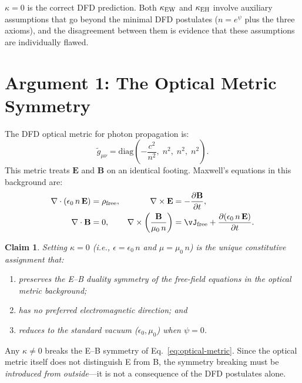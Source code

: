 \documentclass[12pt,a4paper]{article}
\newtheorem{claim}{Claim}
\theoremstyle{definition}
\theoremstyle{remark}
\newcommand{\vE}{\mathbf{E}}
\newcommand{\vB}{\mathbf{B}}
\begin{document}
\begin{tcolorbox}[colback=red!5!white, colframe=red!60!black, title=Central Claim of This Document]
$\kappa = 0$ is the correct DFD prediction.  Both $\kappa_{\rm EW}$
and $\kappa_{\rm EH}$ involve auxiliary assumptions that go beyond the
minimal DFD postulates ($n = e^\psi$ plus the three axioms), and the
disagreement between them is evidence that these assumptions are
individually flawed.
\end{tcolorbox}

\section{Argument 1: The Optical Metric Symmetry}
\label{sec:optical-metric}

The DFD optical metric for photon propagation is:
\begin{equation}
\tilde{g}_{\mu\nu} = \mathrm{diag}\!\left(-\frac{c^2}{n^2},\; n^2,\; n^2,\; n^2\right).
\label{eq:optical-metric}
\end{equation}
This metric treats $\vE$ and $\vB$ on an identical footing.  Maxwell's
equations in this background are:
\begin{align}
\nabla \cdot (\epsilon_0\, n\, \vE) &= \rho_{\rm free}, &
\nabla \times \vE &= -\frac{\partial \vB}{\partial t}, \\
\nabla \cdot \vB &= 0, &
\nabla \times \left(\frac{\vB}{\mu_0\, n}\right) &= \vJ_{\rm free}
  + \frac{\partial(\epsilon_0\, n\, \vE)}{\partial t}.
\end{align}

\begin{claim}
Setting $\kappa = 0$ (i.e., $\epsilon = \epsilon_0\, n$ and
$\mu = \mu_0\, n$) is the \emph{unique} constitutive assignment that:
\begin{enumerate}
\item preserves the E--B duality symmetry of the free-field equations
  in the optical metric background;
\item has no preferred electromagnetic direction; and
\item reduces to the standard vacuum ($\epsilon_0, \mu_0$) when $\psi = 0$.
\end{enumerate}
\end{claim}

Any $\kappa \neq 0$ breaks the E--B symmetry of Eq.~\eqref{eq:optical-metric}.
Since the optical metric itself does not distinguish E from B, the
symmetry breaking must be \emph{introduced from outside}---it is not
a consequence of the DFD postulates alone.
\end{document}
